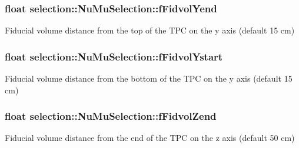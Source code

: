 \subsubsection[{\texorpdfstring{f\+Fidvol\+Yend}{fFidvolYend}}]{\setlength{\rightskip}{0pt plus 5cm}float selection\+::\+Nu\+Mu\+Selection\+::f\+Fidvol\+Yend\hspace{0.3cm}{\ttfamily [private]}}\hypertarget{classselection_1_1NuMuSelection_ac07847d191d7d4db8267d89e0caab414}{}\label{classselection_1_1NuMuSelection_ac07847d191d7d4db8267d89e0caab414}
Fiducial volume distance from the top of the T\+PC on the y axis (default 15 cm) 
\subsubsection[{\texorpdfstring{f\+Fidvol\+Ystart}{fFidvolYstart}}]{\setlength{\rightskip}{0pt plus 5cm}float selection\+::\+Nu\+Mu\+Selection\+::f\+Fidvol\+Ystart\hspace{0.3cm}{\ttfamily [private]}}\hypertarget{classselection_1_1NuMuSelection_a68277003f5211d751a5965dc990ff661}{}\label{classselection_1_1NuMuSelection_a68277003f5211d751a5965dc990ff661}
Fiducial volume distance from the bottom of the T\+PC on the y axis (default 15 cm) 
\subsubsection[{\texorpdfstring{f\+Fidvol\+Zend}{fFidvolZend}}]{\setlength{\rightskip}{0pt plus 5cm}float selection\+::\+Nu\+Mu\+Selection\+::f\+Fidvol\+Zend\hspace{0.3cm}{\ttfamily [private]}}\hypertarget{classselection_1_1NuMuSelection_adae665ca6cf1ece4b7e00b345cebbfe3}{}\label{classselection_1_1NuMuSelection_adae665ca6cf1ece4b7e00b345cebbfe3}
Fiducial volume distance from the end of the T\+PC on the z axis (default 50 cm) 
